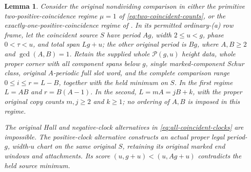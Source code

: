 \documentclass[11pt,a4paper]{amsart}
\numberwithin{equation}{section}
\theoremstyle{plain}
\newtheorem{lemma}[theorem]{Lemma}
\theoremstyle{definition}
\begin{document}
\begin{lemma}\label{lem:coincident-reader}
Consider the original nondividing comparison in either the primitive
two-positive-coincidence regime \(\mu=1\) of
\eqref{eq:two-coincident-counts}, or the exactly-one-positive-coincidence
regime of .  In its permitted ordinary-(a)
row frame, let the coincident source \(S\) have period \(Ag\), width
\(2\le u<g\), phase \(0<\tau<u\), and total span \(Lg+u\); the other
original period is \(Bg\), where \(A,B\ge2\) and \(\gcd(A,B)=1\).
Retain the supplied whole \(\mathcal P(g,u)\) height data, whole proper corner
with all component spans below \(g\), single marked-component Schur
class, original \(A\)-periodic full slot word, and the complete comparison
range \(0\le i\le r=L-B\), together with the held minimum on \(S\).
In the first regime \(L=AB\) and \(r=B(A-1)\).  In the second,
\(L=mA=jB+k\), with the proper original copy counts \(m,j\ge2\) and
\(k\ge1\); no ordering of \(A,B\) is imposed in this regime.

The original Hall and negative-clock alternatives in
\eqref{eq:all-coincident-clocks} are impossible.  The positive-clock
alternative constructs an actual proper legal period-\(g\), width-\(u\)
chart on the same original \(S\), retaining its original marked end
windows and attachments.  Its score \((u,g+u)<(u,Ag+u)\) contradicts
the held source minimum.
\end{lemma}
\end{document}
